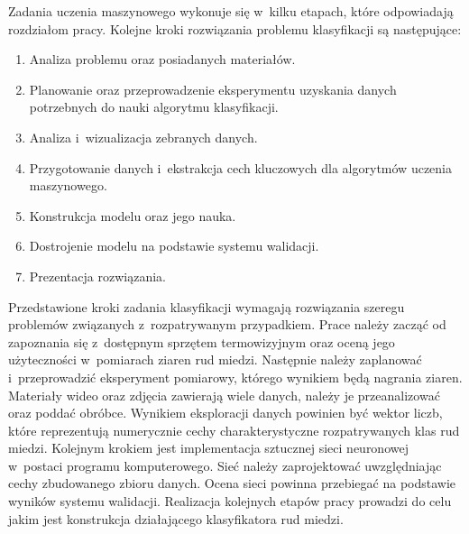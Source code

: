 Zadania uczenia maszynowego wykonuje się w~kilku etapach, które odpowiadają
rozdziałom pracy.
Kolejne kroki rozwiązania problemu klasyfikacji są następujące:
\begin{enumerate}
    \item Analiza problemu oraz posiadanych materiałów.
    \item Planowanie oraz przeprowadzenie eksperymentu uzyskania danych
          potrzebnych do nauki algorytmu klasyfikacji.
    \item Analiza i~wizualizacja zebranych danych.
    \item Przygotowanie danych i~ekstrakcja cech kluczowych dla
          algorytmów uczenia maszynowego.
    \item Konstrukcja modelu oraz jego nauka.
    \item Dostrojenie modelu na podstawie systemu walidacji.
    \item Prezentacja rozwiązania.
\end{enumerate}
Przedstawione kroki zadania klasyfikacji wymagają rozwiązania szeregu problemów
związanych z~rozpatrywanym przypadkiem.
Prace należy zacząć od zapoznania się z~dostępnym sprzętem termowizyjnym oraz
oceną jego użyteczności w~pomiarach ziaren rud miedzi.
Następnie należy zaplanować i~przeprowadzić eksperyment pomiarowy, którego
wynikiem będą nagrania ziaren.
Materiały wideo oraz zdjęcia zawierają wiele danych, należy je przeanalizować
oraz poddać obróbce.
Wynikiem eksploracji danych powinien być wektor liczb, które reprezentują
numerycznie cechy charakterystyczne rozpatrywanych klas rud miedzi.
Kolejnym krokiem jest implementacja sztucznej sieci neuronowej w~postaci programu
komputerowego.
Sieć należy zaprojektować uwzględniając cechy zbudowanego zbioru danych.
Ocena sieci powinna przebiegać na podstawie wyników systemu walidacji.
Realizacja kolejnych etapów pracy prowadzi do celu jakim jest konstrukcja
działającego klasyfikatora rud miedzi.
